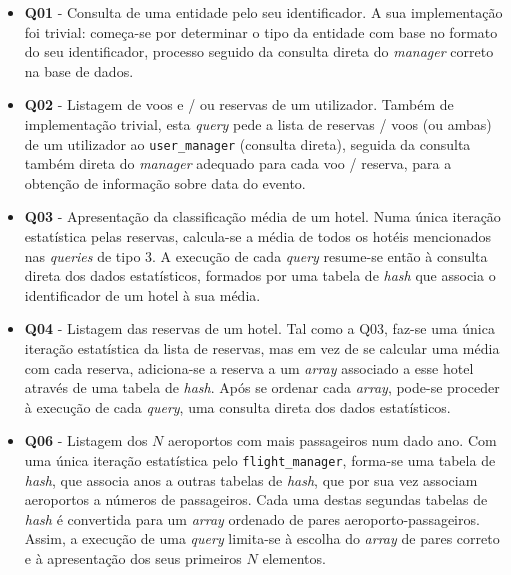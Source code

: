 \documentclass[12pt, a4paper]{article}
\begin{document}
\begin{itemize}
    \item \textbf{Q01} - Consulta de uma entidade pelo seu identificador. A sua implementação foi
                         trivial: começa-se por determinar o tipo da entidade com base no formato
                         do seu identificador, processo seguido da consulta direta do \emph{manager}
                         correto na base de dados.

    \item \textbf{Q02} - Listagem de voos e / ou reservas de um utilizador. Também de implementação
                         trivial, esta \emph{query} pede a lista de reservas / voos (ou ambas) de um
                         utilizador ao \texttt{user\_manager} (consulta direta), seguida da consulta
                         também direta do \emph{manager} adequado para cada voo / reserva, para a
                         obtenção de informação sobre data do evento.

    \item \textbf{Q03} - Apresentação da classificação média de um hotel. Numa única iteração
                         estatística pelas reservas, calcula-se a média de todos os hotéis
                         mencionados nas \emph{queries} de tipo 3. A execução de cada \emph{query}
                         resume-se então à consulta direta dos dados estatísticos, formados por uma
                         tabela de \emph{hash} que associa o identificador de um hotel à sua média.

    \item \textbf{Q04} - Listagem das reservas de um hotel. Tal como a Q03, faz-se uma única
                         iteração estatística da lista de reservas, mas em vez de se calcular uma
                         média com cada reserva, adiciona-se a reserva a um \emph{array} associado
                         a esse hotel através de uma tabela de \emph{hash}. Após se ordenar cada
                         \emph{array}, pode-se proceder à execução de cada \emph{query}, uma
                         consulta direta dos dados estatísticos.

    \item \textbf{Q06} - Listagem dos $N$ aeroportos com mais passageiros num dado ano. Com uma
                         única iteração estatística pelo \texttt{flight\_manager}, forma-se uma
                         tabela de \emph{hash}, que associa anos a outras tabelas de \emph{hash},
                         que por sua vez associam aeroportos a números de passageiros. Cada uma
                         destas segundas tabelas de \emph{hash} é convertida para um \emph{array}
                         ordenado de pares aeroporto-passageiros. Assim, a execução de uma
                         \emph{query} limita-se à escolha do \emph{array} de pares correto e à
                         apresentação dos seus primeiros $N$ elementos.


\end{itemize}
\end{document}
